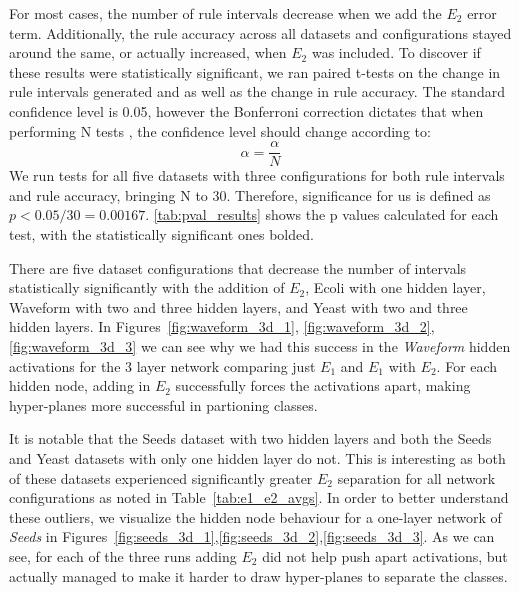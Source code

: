 For most cases, the number of rule intervals decrease when we add
the $E_2$ error term. Additionally, the rule accuracy across all
datasets and configurations stayed around the same, or actually
increased, when $E_2$ was included. To discover if these results were statistically
significant, we ran paired t-tests on the change in rule intervals
generated and as well as the change in rule accuracy. The standard
confidence level is 0.05, however the Bonferroni correction dictates
that when performing N tests \cite{shaffer1995multiple}, the confidence level should change according
to:
\begin{equation}
  \alpha = \frac{\alpha}{N}
\end{equation}
We run tests for all five datasets with three configurations for both
rule intervals and rule accuracy, bringing N to 30. Therefore,
significance for us is defined as $p < 0.05 / 30 =
0.00167$. \ref{tab:pval_results} shows the p values calculated for each
test, with the statistically significant ones bolded. 

There are five dataset configurations that decrease the number of
intervals statistically significantly with the addition of $E_2$, Ecoli with one
hidden layer, Waveform with two and three hidden layers, and Yeast
with two and three hidden layers. In
Figures~\ref{fig:waveform_3d_1}, \ref{fig:waveform_3d_2}, \ref{fig:waveform_3d_3} we
can see why we had this success in the \textit{Waveform} hidden activations
for the 3 layer network comparing just $E_1$ and $E_1$ with $E_2$.
For each hidden node, adding in $E_2$ successfully forces the activations
apart, making hyper-planes more successful in partioning classes. 

It is notable that
the Seeds dataset with two hidden layers and both the
Seeds and Yeast datasets with only one
hidden layer do not. This is interesting as both of these datasets
experienced significantly greater $E_2$ separation for all network
configurations as noted in Table~\ref{tab:e1_e2_avgs}. In order
to better understand these outliers, we visualize the hidden node
behaviour for a one-layer network of \textit{Seeds}
in Figures~\ref{fig:seeds_3d_1},\ref{fig:seeds_3d_2},\ref{fig:seeds_3d_3}.
As we can see, for each of the three runs adding $E_2$ did not help push apart
activations, but actually managed to make it harder to draw hyper-planes
to separate the classes.

